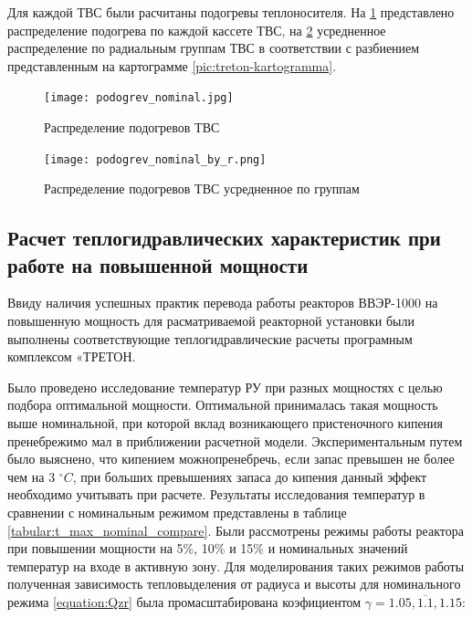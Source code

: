Для каждой ТВС были расчитаны подогревы теплоносителя. На \ref{pic:treton-podogrev-nominal} представлено распределение подогрева по каждой кассете ТВС, на \ref{pic:treton-podogrev-nominal-by-r} усредненное распределение по радиальным группам ТВС в соответствии с разбиением представленным на картограмме \ref{pic:treton-kartogramma}.


\begin{figure}[H]
	\begin{center}
		\texttt{[image: podogrev\_nominal.jpg]}
		\caption{Распределение подогревов ТВС}
		\label{pic:treton-podogrev-nominal} %
	\end{center}
\end{figure}

\begin{figure}[H]
	\begin{center}
		\texttt{[image: podogrev\_nominal\_by\_r.png]}
		\caption{Распределение подогревов ТВС усредненное по группам}
		\label{pic:treton-podogrev-nominal-by-r} %
	\end{center}
\end{figure}


\subsection{Расчет теплогидравлических характеристик при работе на повышенной мощности}
Ввиду наличия успешных практик перевода работы реакторов ВВЭР-1000 на повышенную мощность для расматриваемой реакторной установки были выполнены соответствующие теплогидравлические расчеты програмным комплексом «ТРЕТОН. 

Было проведено исследование температур РУ при разных мощностях с целью подбора оптимальной мощности. Оптимальной принималась такая мощность выше номинальной, при которой вклад возникающего пристеночного кипения пренебрежимо мал в приближении расчетной модели. Экспериментальным путем было выяснено, что кипением можнопренебречь, если запас превышен не более чем на 3 $^\circ C$, при больших превышениях запаса до кипения данный эффект необходимо учитывать при расчете. Результаты исследования температур в сравнении с номинальным режимом представлены в таблице \ref{tabular:t_max_nominal_compare}. Были рассмотрены режимы работы реактора при повышении мощности на 5\%, 10\% и 15\% и номинальных значений температур на входе в активную зону. Для моделирования таких режимов работы полученная зависимость тепловыделения от радиуса и высоты для номинального режима \ref{equation:Qzr} была промасштабирована коэфициентом $\gamma = \overline{1.05, 1.1, 1.15}$:


